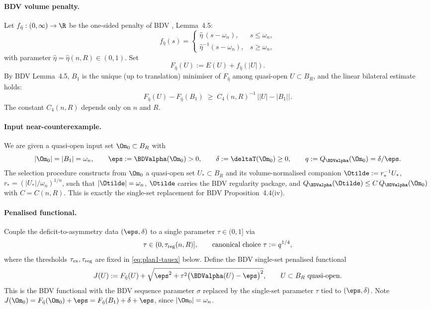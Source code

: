 \paragraph{BDV volume penalty.}
Let $f_{\hat\eta}:(0,\infty)\to\R$ be the one-sided penalty of BDV
\cite{BDV}, Lemma~4.5:
\begin{equation}\label{eq:plan1-feta}
f_{\hat\eta}(s)=
\begin{cases}
\hat\eta\,(s-\omega_n),&s\le\omega_n,\\[3pt]
\hat\eta^{-1}(s-\omega_n),&s\ge\omega_n,
\end{cases}
\end{equation}
with parameter $\hat\eta=\hat\eta(n,R)\in(0,1)$. Set
\[
F_{\hat\eta}(U):=E(U)+f_{\hat\eta}(|U|).
\]
By BDV Lemma~4.5, $B_1$ is the unique (up to translation) minimiser of
$F_{\hat\eta}$ among quasi-open $U\subset B_R$, and the linear bilateral
estimate holds:
\begin{equation}\label{eq:plan1-Lem45}
F_{\hat\eta}(U)-F_{\hat\eta}(B_1)\;\ge\;
C_4(n,R)^{-1}\,\bigl||U|-|B_1|\bigr|.
\end{equation}
The constant $C_4(n,R)$ depends only on $n$ and $R$.

\paragraph{Input near-counterexample.}
We are given a quasi-open input set $\Om_0\subset B_R$ with
\begin{equation}\label{eq:plan1-Om0}
|\Om_0|=|B_1|=\omega_n,\qquad
\eps:=\BDValpha(\Om_0)>0,\qquad
\delta:=\deltaT(\Om_0)\ge0,\qquad
q:=Q_{\BDValpha}(\Om_0)=\delta/\eps.
\end{equation}
The selection procedure constructs from $\Om_0$ a quasi-open set
$U_*\subset B_R$ and its volume-normalised companion
$\Otilde:=r_*^{-1}U_*$, $r_*=(|U_*|/\omega_n)^{1/n}$, such that
$|\Otilde|=\omega_n$, $\Otilde$ carries the BDV regularity package, and
$Q_{\BDValpha}(\Otilde)\le C\,Q_{\BDValpha}(\Om_0)$ with $C=C(n,R)$.
This is exactly the single-set replacement for BDV
Proposition~4.4(iv).

\paragraph{Penalised functional.}
Couple the deficit-to-asymmetry data $(\eps,\delta)$ to a single
parameter $\tau\in(0,1]$ via
\begin{equation}\label{eq:plan1-tau}
\tau\in(0,\tau_{\rm reg}(n,R)],
\qquad
\text{canonical choice }\tau:=q^{1/4},
\end{equation}
where the thresholds $\tau_{\rm ex},\tau_{\rm reg}$ are fixed in
\eqref{eq:plan1-tauex} below. Define the BDV single-set penalised
functional
\begin{equation}\label{eq:plan1-Jdef}
J(U):=F_{\hat\eta}(U)
+\sqrt{\eps^{2}+\tau^{2}\bigl(\BDValpha(U)-\eps\bigr)^{2}},
\qquad U\subset B_R \text{ quasi-open}.
\end{equation}
This is the BDV functional \cite[(4.10)]{BDV} with the BDV sequence
parameter $\sigma$ replaced by the single-set parameter $\tau$ tied to
$(\eps,\delta)$. Note $J(\Om_0)=F_{\hat\eta}(\Om_0)+\eps=
F_{\hat\eta}(B_1)+\delta+\eps$, since $|\Om_0|=\omega_n$.

